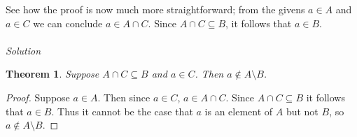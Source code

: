 \documentclass{report}
\newtheorem*{theorem}{Theorem}
\theoremstyle{definition}
\begin{document}
See how the proof is now much more straightforward; from the givens $a\in A$ and $a\in C$ we can conclude $a\in A\cap C$. Since $A\cap C\subseteq B$, it follows that $a\in B$.\\
\vspace{1mm}\\
\textit{Solution}
\begin{theorem} 
Suppose $A\cap C\subseteq B$ and $a\in C$. Then $a\notin A\setminus B$.
\end{theorem}
\begin{proof} 
Suppose $a\in A$. Then since $a\in C$, $a\in A\cap C$. Since $A\cap C\subseteq B$ it follows that $a\in B$. Thus it cannot be the case that $a$ is an element of $A$ but not $B$, so 
$a\notin A\setminus B$.
\end{proof}
\newpage
\end{document}
